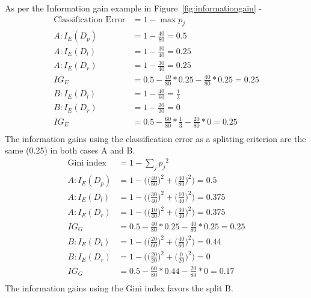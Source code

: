 \documentclass{article}
\begin{document}
As per the Information gain example in Figure~\ref{fig:informationgain} -
\begin{align*}
\mbox{Classification Error} &= 1 - \max p_j \\
A: I_E(D_p) &= 1 - \frac{40}{80} = 0.5\\
A: I_E(D_l)  &= 1 - \frac{30}{40} = 0.25\\
A: I_E(D_r)  &= 1 - \frac{30}{40} = 0.25\\
IG_{E} &= 0.5 - \frac{40}{80} * 0.25 - \frac{40}{80} * 0.25 = 0.25 \\
B: I_E(D_l)  &= 1 - \frac{40}{60} = \frac{1}{3}\\
B: I_E(D_r)  &= 1 - \frac{20}{20} = 0\\
IG_{E} &= 0.5 - \frac{60}{80} * \frac{1}{3} - \frac{20}{80} * 0 = 0.25 \\
\end{align*}
The information gains using the classification error as a splitting criterion are the same (0.25) in both cases A and B.
\begin{align*}
\mbox{Gini index} &= 1 - \sum_j {p_j}^2 \\
A: I_E(D_p) &= 1 - \bigg(\Big(\frac{40}{80}\Big)^2 + \Big(\frac{40}{80}\Big)^2\bigg) = 0.5\\
A: I_E(D_l)  &= 1 - \bigg(\Big(\frac{30}{40}\Big)^2 + \Big(\frac{10}{40}\Big)^2\bigg) = 0.375\\
A: I_E(D_r)  &= 1 - \bigg(\Big(\frac{10}{40}\Big)^2 + \Big(\frac{30}{40}\Big)^2\bigg) = 0.375\\
IG_{G} &= 0.5 - \frac{40}{80} * 0.25 - \frac{40}{80} * 0.25 = 0.25 \\
B: I_E(D_l)  &= 1 - \bigg(\Big(\frac{20}{60}\Big)^2 + \Big(\frac{40}{60}\Big)^2\bigg) = 0.44\\
B: I_E(D_r)  &= 1 - \bigg(\Big(\frac{20}{20}\Big)^2 + \Big(\frac{0}{20}\Big)^2\bigg) = 0\\
IG_{G} &= 0.5 - \frac{60}{80} * 0.44 - \frac{20}{80} * 0 = 0.17 \\
\end{align*}
The information gains using the Gini index favors the split B.
\end{document}
